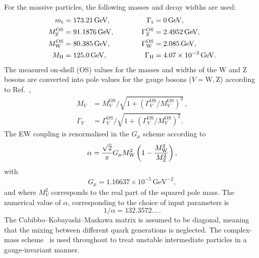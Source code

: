 \documentclass[twocolumn,epjc3]{svjour3} %
\newcommand{\PH}{\ensuremath{\text{H}}\xspace}
\newcommand{\Pt}{\ensuremath{\text{t}}\xspace}
\newcommand{\PW}{\ensuremath{\text{W}}\xspace}
\newcommand{\PZ}{\ensuremath{\text{Z}}\xspace}
\newcommand{\Mt}{\ensuremath{m_\Pt}\xspace}
\newcommand{\MWOS}{\ensuremath{M_\PW^\text{OS}}\xspace}
\newcommand{\MZOS}{\ensuremath{M_\PZ^\text{OS}}\xspace}
\newcommand{\Gt}{\ensuremath{\Gamma_\Pt}\xspace}
\newcommand{\GH}{\ensuremath{\Gamma_\PH}\xspace}
\newcommand{\GZOS}{\ensuremath{\Gamma_\PZ^\text{OS}}\xspace}
\newcommand{\GWOS}{\ensuremath{\Gamma_\PW^\text{OS}}\xspace}
\newcommand{\GeV}{\ensuremath{\,\text{GeV}}\xspace}
\newcommand{\MVOS}{\ensuremath{M_{V}^\text{OS}}\xspace}%
\newcommand{\GVOS}{\ensuremath{\Gamma_{V}^\text{OS}}\xspace}%
\newlength{\width}
\begin{document}
    For the massive particles, the following masses and decay widths are used:
    \begin{alignat}{2}
                      \Mt   &=  173.21\GeV,       & \quad \quad \quad \Gt &= 0 \GeV,  \nonumber \\
                    \MZOS &=  91.1876\GeV,      & \quad \quad \quad \GZOS &= 2.4952\GeV,  \nonumber \\
                    \MWOS &=  80.385\GeV,       & \GWOS &= 2.085\GeV,  \nonumber \\
                    M_{\rm H} &=  125.0\GeV,       &  \GH   &=  4.07 \times 10^{-3}\GeV.
    \end{alignat}
    The measured on-shell (OS) values for the masses and widths of the W and Z bosons are converted into pole values for the gauge bosons ($V=\PW,\PZ$) according to Ref.~\cite{Bardin:1988xt},
    \begin{equation}
    \begin{split}
            M_V &= \MVOS/\sqrt{1+(\GVOS/\MVOS)^2}\,, \\
       \Gamma_V &= \GVOS/\sqrt{1+(\GVOS/\MVOS)^2}.
    \end{split}
    \end{equation}
    The EW coupling is renormalised in the $G_\mu$ scheme \cite{Denner:2000bj} according to 
    \begin{equation}
    \alpha =  \frac{\sqrt{2}}{\pi} G_{\mu} M_{\rm W}^2 \left(1-\frac{M_{\rm W}^2}{M_{\rm Z}^2} \right),
    \end{equation}
    with
    \begin{equation}
        G_{\mu}    = 1.16637\times 10^{-5}\GeV^{-2},
    \end{equation}
    and where $M_V^2$ corresponds to the real part of the squared pole mass.
    The numerical value of $\alpha$, corresponding to the choice of input parameters is
    \begin{equation}
     1/\alpha = 132.3572\ldots\,.
    \end{equation}
    The Cabibbo--Kobayashi--Maskawa matrix is assumed to be diagonal, meaning that the mixing between different quark generations is neglected.
    The complex-mass scheme~\cite{Denner:1999gp,Denner:2005fg,Denner:2006ic} is used throughout to treat unstable intermediate particles in a gauge-invariant manner.
\end{document}
